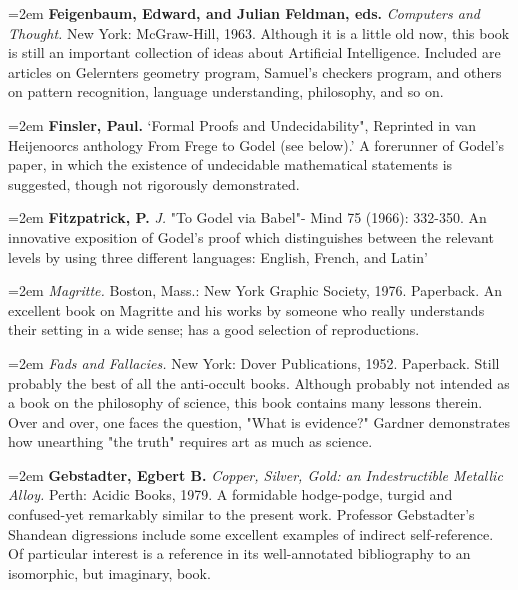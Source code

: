 \par\noindent\hangindent=2em {\bf Feigenbaum, Edward, and Julian Feldman, eds.} {\it Computers and Thought.} New York: McGraw-Hill, 1963. Although it is a little old now, this book is still an important collection of ideas about Artificial Intelligence. Included are articles on Gelernters geometry program, Samuel's checkers program, and others on pattern recognition, language understanding, philosophy, and so on.

\par\noindent\hangindent=2em {\bf Finsler, Paul.} `Formal Proofs and Undecidability", Reprinted in van Heijenoorcs anthology From Frege to Godel (see below).' A forerunner of Godel's paper, in which the existence of undecidable mathematical statements is suggested, though not rigorously demonstrated.

\par\noindent\hangindent=2em {\bf Fitzpatrick, P.} {\it J.} "To Godel via Babel"- Mind 75 (1966): 332-350. An innovative exposition of Godel's proof which distinguishes between the relevant levels by using three different languages: English, French, and Latin'

\par\noindent\hangindent=2em  {\it Magritte.} Boston, Mass.: New York Graphic Society, 1976. Paperback. An excellent book on Magritte and his works by someone who really understands their setting in a wide sense; has a good selection of reproductions.

\par\noindent\hangindent=2em  {\it Fads and Fallacies.} New York: Dover Publications, 1952. Paperback. Still probably the best of all the anti-occult books. Although probably not intended as a book on the philosophy of science, this book contains many lessons therein. Over and over, one faces the question, "What is evidence?" Gardner demonstrates how unearthing "the truth" requires art as much as science.

\par\noindent\hangindent=2em {\bf Gebstadter, Egbert B.} {\it Copper, Silver, Gold: an Indestructible Metallic Alloy.} Perth: Acidic Books, 1979. A formidable hodge-podge, turgid and confused-yet remarkably similar to the present work. Professor Gebstadter's Shandean digressions include some excellent examples of indirect self-reference. Of particular interest is a reference in its well-annotated bibliography to an isomorphic, but imaginary, book.

